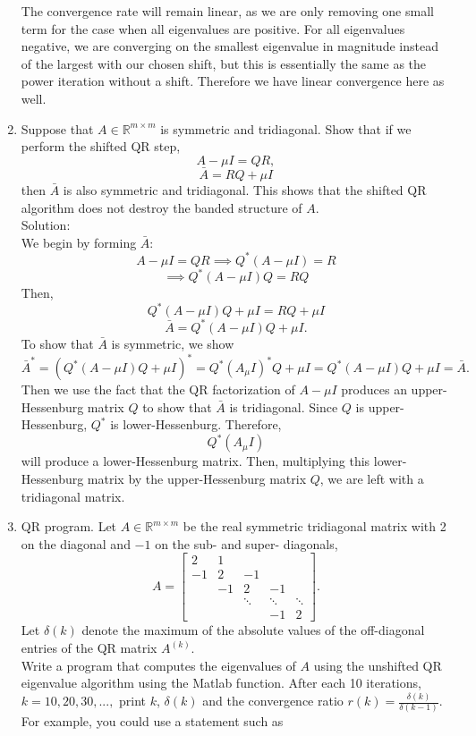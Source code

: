 \documentclass[12pt]{article}
\numberwithin{equation}{section}
\begin{document}
\begin{enumerate}
    The convergence rate will remain linear, as we are only removing one small term for the case when all eigenvalues are positive. For all eigenvalues negative, we are converging on the smallest eigenvalue in magnitude instead of the largest with our chosen shift, but this is essentially the same as the power iteration without a shift. Therefore we have linear convergence here as well.
    \item Suppose that $A\in\mathbb{R}^{m\times m}$ is symmetric and tridiagonal. Show that if we perform the shifted QR step,
        $$A-\mu I=QR,$$
        $$\bar{A}=RQ+\mu I$$
        then $\bar{A}$ is also symmetric and tridiagonal. This shows that the shifted QR algorithm does not destroy the banded structure of $A$.\\

        Solution:\\

        We begin by forming $\bar{A}$:
        $$A-\mu I=QR\implies Q^*(A-\mu I)=R$$
        $$\implies Q^*(A-\mu I)Q=RQ$$
        Then,
        $$Q^*(A-\mu I)Q+\mu I=RQ+\mu I$$
        $$\bar{A}=Q^*(A-\mu I)Q+\mu I.$$
        To show that $\bar{A}$ is symmetric, we show
        $$\bar{A}^*=(Q^*(A-\mu I)Q+\mu I)^*=Q^*(A_\mu I)^*Q+\mu I=Q^*(A-\mu I)Q+\mu I=\bar{A}.$$
        Then we use the fact that the QR factorization of $A-\mu I$ produces an upper-Hessenburg matrix $Q$ to show that $\bar{A}$ is tridiagonal. Since $Q$ is upper-Hessenburg, $Q^*$ is lower-Hessenburg. Therefore,
        $$Q^*(A_\mu I)$$
        will produce a lower-Hessenburg matrix. Then, multiplying this lower-Hessenburg matrix by the upper-Hessenburg matrix $Q$, we are left with a tridiagonal matrix.

    \item QR program. Let $A\in\mathbb{R}^{m\times m}$ be the real symmetric tridiagonal matrix with 2 on the diagonal and $-1$ on the sub- and super- diagonals,
        $$A=\left[\begin{array}{ccccc}2&1&&&\\-1&2&-1&&\\&-1&2&-1&\\&&\ddots&\ddots&\ddots\\&&&-1&2\end{array}\right].$$
        Let $\delta(k)$ denote the maximum of the absolute values of the off-diagonal entries of the QR matrix $A^{(k)}$.\\
        Write a program that computes the eigenvalues of $A$ using the unshifted QR eigenvalue algorithm using the Matlab  function. After each 10 iterations, $k=10,20,30,...,$ print $k$, $\delta(k)$ and the convergence ratio $r(k)=\frac{\delta(k)}{\delta(k-1)}$. For example, you could use a statement such as


\end{enumerate}
\end{document}
